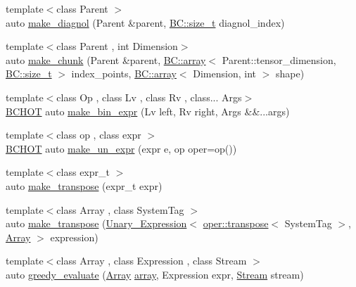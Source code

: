\begin{DoxyCompactItemize}
\item 
{\footnotesize template$<$class Parent $>$ }\\auto \hyperlink{namespaceBC_1_1tensors_1_1exprs_a085f4eca90627b9ede51fa3cb28393dd}{make\+\_\+diagnol} (Parent \&parent, \hyperlink{namespaceBC_a6007cbc4eeec401a037b558910a56173}{B\+C\+::size\+\_\+t} diagnol\+\_\+index)
\item 
{\footnotesize template$<$class Parent , int Dimension$>$ }\\auto \hyperlink{namespaceBC_1_1tensors_1_1exprs_a0c5f5150c426ac8271127f14fe9f2ba4}{make\+\_\+chunk} (Parent \&parent, \hyperlink{structBC_1_1array}{B\+C\+::array}$<$ Parent\+::tensor\+\_\+dimension, \hyperlink{namespaceBC_a6007cbc4eeec401a037b558910a56173}{B\+C\+::size\+\_\+t} $>$ index\+\_\+points, \hyperlink{structBC_1_1array}{B\+C\+::array}$<$ Dimension, int $>$ shape)
\item 
{\footnotesize template$<$class Op , class Lv , class Rv , class... Args$>$ }\\\hyperlink{BlackCat__Common_8h_ac085f07cc309e3aac24aa3fc0a40f6d2}{B\+C\+H\+OT} auto \hyperlink{namespaceBC_1_1tensors_1_1exprs_a851668d03cfe02530189d707ee68d5a5}{make\+\_\+bin\+\_\+expr} (Lv left, Rv right, Args \&\&...args)
\item 
{\footnotesize template$<$class op , class expr $>$ }\\\hyperlink{BlackCat__Common_8h_ac085f07cc309e3aac24aa3fc0a40f6d2}{B\+C\+H\+OT} auto \hyperlink{namespaceBC_1_1tensors_1_1exprs_a01fcbec06e67c68b1864bad153f4c357}{make\+\_\+un\+\_\+expr} (expr e, op oper=op())
\item 
{\footnotesize template$<$class expr\+\_\+t $>$ }\\auto \hyperlink{namespaceBC_1_1tensors_1_1exprs_a90b7b32c18059fcc6b7c6ab77c7511f0}{make\+\_\+transpose} (expr\+\_\+t expr)
\item 
{\footnotesize template$<$class Array , class System\+Tag $>$ }\\auto \hyperlink{namespaceBC_1_1tensors_1_1exprs_aa13ee96de47302c3c9ea45be134812ba}{make\+\_\+transpose} (\hyperlink{structBC_1_1tensors_1_1exprs_1_1Unary__Expression}{Unary\+\_\+\+Expression}$<$ \hyperlink{structBC_1_1oper_1_1transpose}{oper\+::transpose}$<$ System\+Tag $>$, \hyperlink{classBC_1_1tensors_1_1exprs_1_1Array}{Array} $>$ expression)
\item 
{\footnotesize template$<$class Array , class Expression , class Stream $>$ }\\auto \hyperlink{namespaceBC_1_1tensors_1_1exprs_ac576159b50ffcc110425222c9e2505c6}{greedy\+\_\+evaluate} (\hyperlink{classBC_1_1tensors_1_1exprs_1_1Array}{Array} \hyperlink{structBC_1_1array}{array}, Expression expr, \hyperlink{namespaceBC_abc64a63cd29a22d102a68f478dfd588d}{Stream} stream)

\end{DoxyCompactItemize}
